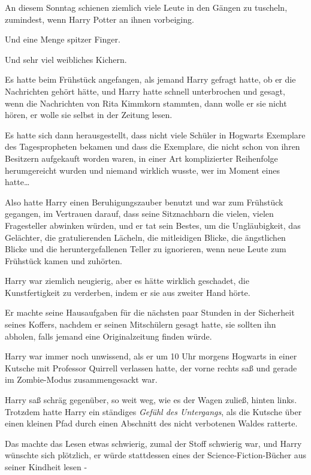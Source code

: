 {An diesem Sonntag schienen ziemlich viele Leute in den Gängen zu tuscheln, zumindest, wenn Harry Potter an ihnen vorbeiging.

Und eine Menge spitzer Finger.

Und sehr viel weibliches Kichern.

Es hatte beim Frühstück angefangen, als jemand Harry gefragt hatte, ob er die Nachrichten gehört hätte, und Harry hatte schnell unterbrochen und gesagt, wenn die Nachrichten von Rita Kimmkorn stammten, dann wolle er sie nicht hören, er wolle sie selbst in der Zeitung lesen.

Es hatte sich dann herausgestellt, dass nicht viele Schüler in Hogwarts Exemplare des Tagespropheten bekamen und dass die Exemplare, die nicht schon von ihren Besitzern aufgekauft worden waren, in einer Art komplizierter Reihenfolge herumgereicht wurden und niemand wirklich wusste, wer im Moment eines hatte…

Also hatte Harry einen Beruhigungszauber benutzt und war zum Frühstück gegangen, im Vertrauen darauf, dass seine Sitznachbarn die vielen, vielen Fragesteller abwinken würden, und er tat sein Bestes, um die Ungläubigkeit, das Gelächter, die gratulierenden Lächeln, die mitleidigen Blicke, die ängstlichen Blicke und die heruntergefallenen Teller zu ignorieren, wenn neue Leute zum Frühstück kamen und zuhörten.

Harry war ziemlich neugierig, aber es hätte wirklich geschadet, die Kunstfertigkeit zu verderben, indem er sie aus zweiter Hand hörte.

Er machte seine Hausaufgaben für die nächsten paar Stunden in der Sicherheit seines Koffers, nachdem er seinen Mitschülern gesagt hatte, sie sollten ihn abholen, falls jemand eine Originalzeitung finden würde.

Harry war immer noch unwissend, als er um 10 Uhr morgens Hogwarts in einer Kutsche mit Professor Quirrell verlassen hatte, der vorne rechts saß und gerade im Zombie-Modus zusammengesackt war.

Harry saß schräg gegenüber, so weit weg, wie es der Wagen zuließ, hinten links. Trotzdem hatte Harry ein ständiges \emph{Gefühl des Untergangs}, als die Kutsche über einen kleinen Pfad durch einen Abschnitt des nicht verbotenen Waldes ratterte.

Das machte das Lesen etwas schwierig, zumal der Stoff schwierig war, und Harry wünschte sich plötzlich, er würde stattdessen eines der Science-Fiction-Bücher aus seiner Kindheit lesen -

}
